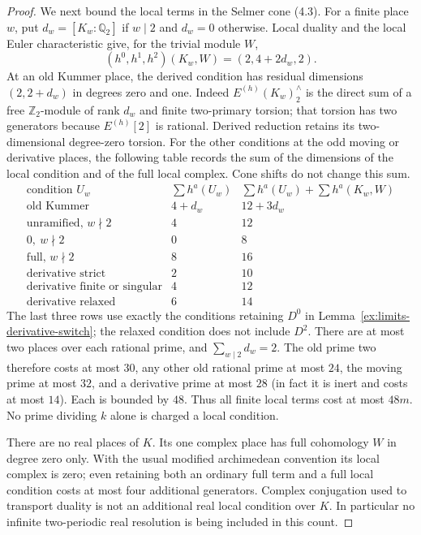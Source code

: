 \documentclass[11pt]{article}
\theoremstyle{definition}
\theoremstyle{remark}
\newcommand{\Q}{\mathbb Q}
\newcommand{\Z}{\mathbb Z}
\begin{document}
\begin{proof}
We next bound the local terms in the Selmer cone (4.3). For a finite
place $w$, put $d_w=[K_w:\Q_2]$ if $w\mid2$ and $d_w=0$
otherwise. Local duality and the local Euler characteristic
\cite[I.2.3 and I.2.8]{milne} give, for the trivial module $W$,
\[
 (h^0,h^1,h^2)(K_w,W)=(2,4+2d_w,2).
\]
At an old Kummer place, the derived condition has residual dimensions
$(2,2+d_w)$ in degrees zero and one. Indeed
$E^{(h)}(K_w)^\wedge_2$ is the direct sum of a free
$\Z_2$-module of rank $d_w$ and finite two-primary torsion;
that torsion has two generators because $E^{(h)}[2]$ is rational.
Derived reduction retains its two-dimensional degree-zero torsion.
For the other conditions at the odd moving or derivative places,
the following table records the sum of the dimensions of the local
condition and of the full local complex. Cone shifts do not change
this sum.
\[
\begin{array}{c|c|c}
\text{condition }U_w&\sum h^a(U_w)&
       \sum h^a(U_w)+\sum h^a(K_w,W)\\ \hline
\text{old Kummer}&4+d_w&12+3d_w\\
\text{unramified, }w\nmid2&4&12\\
0,\ w\nmid2&0&8\\
\text{full, }w\nmid2&8&16\\
\text{derivative strict}&2&10\\
\text{derivative finite or singular}&4&12\\
\text{derivative relaxed}&6&14
\end{array}
\]
The last three rows use exactly the conditions retaining $D^0$
in Lemma~\ref{ex:limits-derivative-switch}; the relaxed condition
does not include $D^2$. There are at most two places over each
rational prime, and $\sum_{w\mid2}d_w=2$. The old prime two
therefore costs at most $30$, any other old rational prime at most
$24$, the moving prime at most $32$, and a derivative prime at
most $28$ (in fact it is inert and costs at most $14$).
Each is bounded by $48$. Thus all finite local terms cost at most
$48m$. No prime dividing $k$ alone is charged a local condition.

There are no real places of $K$. Its one complex place has full
cohomology $W$ in degree zero only. With the usual modified
archimedean convention its local complex is zero; even retaining
both an ordinary full term and a full local condition costs at
most four additional generators. Complex conjugation used to
transport duality is not an additional real local condition over
$K$. In particular no infinite two-periodic real resolution is
being included in this count.


\end{proof}
\end{document}
